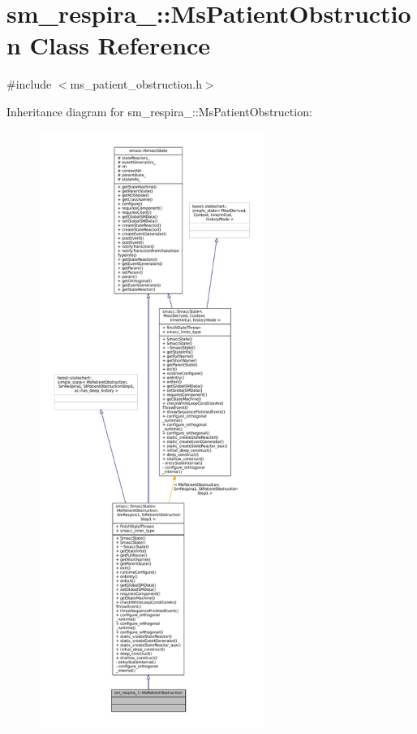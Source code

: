 \hypertarget{classsm__respira__1_1_1MsPatientObstruction}{}\section{sm\+\_\+respira\+\_\+:\+:Ms\+Patient\+Obstruction Class Reference}
\label{classsm__respira__1_1_1MsPatientObstruction}


{\ttfamily \#include $<$ms\+\_\+patient\+\_\+obstruction.\+h$>$}



Inheritance diagram for sm\+\_\+respira\+\_\+:\+:Ms\+Patient\+Obstruction\+:
\nopagebreak
\begin{figure}[H]
\begin{center}
\leavevmode
\includegraphics[height=550pt]{classsm__respira__1_1_1MsPatientObstruction__inherit__graph}
\end{center}
\end{figure}


